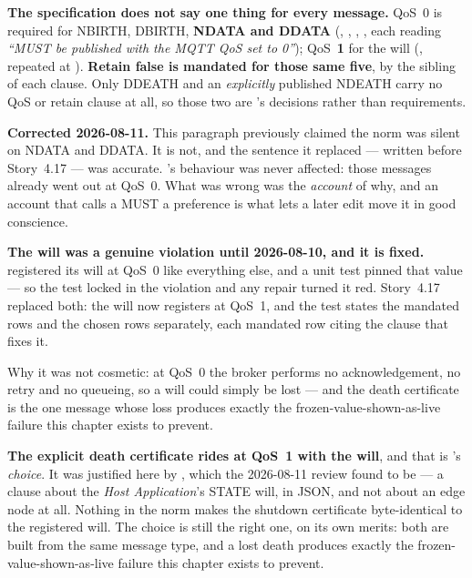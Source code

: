 \begin{note}
\textbf{The specification does not say one thing for every message.} QoS~0 is required for
NBIRTH, DBIRTH, \textbf{NDATA and DDATA} (,
, , , each reading
\emph{``MUST be published with the MQTT QoS set to 0''}); QoS~\textbf{1} for the will
(, repeated at
). \textbf{Retain false is mandated for those
same five}, by the  sibling of each clause. Only DDEATH and an
\emph{explicitly} published NDEATH carry no QoS or retain clause at all, so those two are
\prog's decisions rather than requirements.

\textbf{Corrected 2026-08-11.} This paragraph previously claimed the norm was silent on
NDATA and DDATA. It is not, and the sentence it replaced --- written before Story~4.17 ---
was accurate. \prog's behaviour was never affected: those messages already went out at
QoS~0. What was wrong was the \emph{account} of why, and an account that calls a MUST a
preference is what lets a later edit move it in good conscience.
\end{note}

\begin{note}
\textbf{The will was a genuine violation until 2026-08-10, and it is fixed.} \prog
registered its will at QoS~0 like everything else, and a unit test pinned that value ---
so the test locked in the violation and any repair turned it red. Story~4.17 replaced both:
the will now registers at QoS~1, and the test states the mandated rows and the chosen rows
separately, each mandated row citing the clause that fixes it.

Why it was not cosmetic: at QoS~0 the broker performs no acknowledgement, no retry and no
queueing, so a will could simply be lost --- and the death certificate is the one message
whose loss produces exactly the frozen-value-shown-as-live failure this chapter exists to
prevent.
\end{note}

\textbf{The explicit death certificate rides at QoS~1 with the will}, and that is \prog's
\emph{choice}. It was justified here by , which the
2026-08-11 review found to be
 --- a clause about the
\emph{Host Application}'s STATE will, in JSON, and not about an edge node at all. Nothing
in the norm makes the shutdown certificate byte-identical to the registered will. The
choice is still the right one, on its own merits: both are built from the same message
type, and a lost death produces exactly the frozen-value-shown-as-live failure this chapter
exists to prevent.

